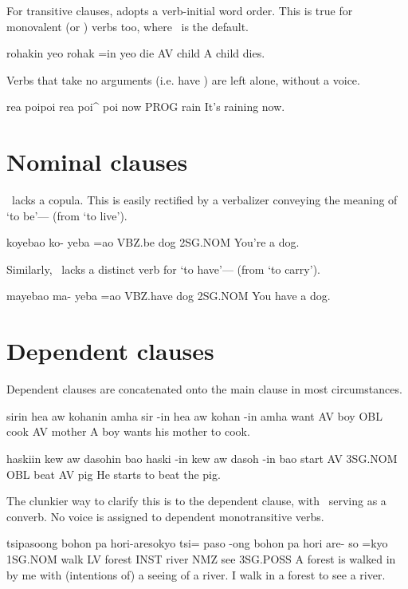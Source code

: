 For transitive clauses, \langname{} adopts a verb-initial word order.
This is true for monovalent (or ) verbs too, where \AV~is the default.
\begin{examples}
	\ex
	\label{ex:the_child_dies}
	\script rohakin yeo
	\bits rohak =in yeo
	\gloss die AV child
	\tr A child dies.
\end{examples}

Verbs that take no arguments (i.e. have ) are left alone, without a voice.
\begin{examples}
	\ex
	\label{ex:its_raining}
	\script rea poipoi
	\bits rea poi^ poi
	\gloss now PROG rain
	\tr It's raining now.
\end{examples}

\section{Nominal clauses}
\langname~lacks a copula. This is easily rectified by a verbalizer conveying the meaning of `to be'--- (from  `to live').
\begin{examples}
	\ex
	\label{ex:you_bitch}
	\script koyebao
	\bits ko- yeba =ao
	\gloss VBZ.be dog 2SG.NOM
	\tr You're a dog.
\end{examples}

Similarly, \langname~lacks a distinct verb for `to have'--- (from  `to carry').
\begin{examples}
	\ex
	\label{ex:you_have_a_dog}
	\script mayebao
	\bits ma- yeba =ao
	\gloss VBZ.have dog 2SG.NOM
	\tr You have a dog.
\end{examples}

\section{Dependent clauses}
Dependent clauses are concatenated onto the main clause in most circumstances.
\begin{examples}
	\ex
	\label{ex:boy_want_mom_cook}
	\script sirin hea aw kohanin amha
	\bits sir -in hea aw kohan -in amha
	\gloss want AV boy OBL cook AV mother
	\tr A boy wants his mother to cook.
\end{examples}
\begin{examples}
	\ex
	\label{ex:he_started_beating_the_pig}
	\script haskiin kew aw dasohin bao
	\bits haski -in kew aw dasoh -in bao
	\gloss start AV 3SG.NOM OBL beat AV pig
	\tr He starts to beat the pig.
\end{examples}
The clunkier way to clarify this is to  the dependent clause,
with \INST~serving as a converb. No voice is assigned to dependent monotransitive verbs.
\begin{examples}
	\ex
	\label{ex:go_forest_to_see_river}
	\script tsipasoong bohon pa hori-aresokyo
	\bits tsi= paso -ong bohon pa hori are- so =kyo
	\gloss 1SG.NOM walk LV forest INST river NMZ see 3SG.POSS
	\tr A forest is walked in by me with (intentions of) a seeing of a river.
	\tr I walk in a forest to see a river.
\end{examples}

